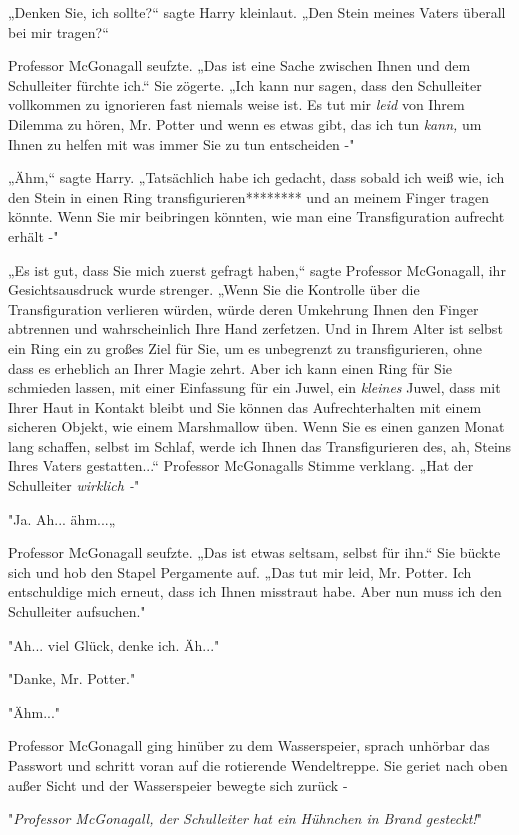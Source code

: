 {„Denken Sie, ich sollte?“ sagte Harry kleinlaut. „Den Stein meines Vaters überall bei mir tragen?“

Professor McGonagall seufzte. „Das ist eine Sache zwischen Ihnen und dem Schulleiter fürchte ich.“ Sie zögerte. „Ich kann nur sagen, dass den Schulleiter vollkommen zu ignorieren fast niemals weise ist. Es tut mir \emph{leid} von Ihrem Dilemma zu hören, Mr. Potter und wenn es etwas gibt, das ich tun \emph{kann,} um Ihnen zu helfen mit was immer Sie zu tun entscheiden -"

„Ähm,“ sagte Harry. „Tatsächlich habe ich gedacht, dass sobald ich weiß wie, ich den Stein in einen Ring transfigurieren******** und an meinem Finger tragen könnte. Wenn Sie mir beibringen könnten, wie man eine Transfiguration aufrecht erhält -"

„Es ist gut, dass Sie mich zuerst gefragt haben,“ sagte Professor McGonagall, ihr Gesichtsausdruck wurde strenger. „Wenn Sie die Kontrolle über die Transfiguration verlieren würden, würde deren Umkehrung Ihnen den Finger abtrennen und wahrscheinlich Ihre Hand zerfetzen. Und in Ihrem Alter ist selbst ein Ring ein zu großes Ziel für Sie, um es unbegrenzt zu transfigurieren, ohne dass es erheblich an Ihrer Magie zehrt. Aber ich kann einen Ring für Sie schmieden lassen, mit einer Einfassung für ein Juwel, ein \emph{kleines} Juwel, dass mit Ihrer Haut in Kontakt bleibt und Sie können das Aufrechterhalten mit einem sicheren Objekt, wie einem Marshmallow üben. Wenn Sie es einen ganzen Monat lang schaffen, selbst im Schlaf, werde ich Ihnen das Transfigurieren des, ah, Steins Ihres Vaters gestatten...“ Professor McGonagalls Stimme verklang. „Hat der Schulleiter \emph{wirklich -}"

"Ja. Ah... ähm...„

Professor McGonagall seufzte. „Das ist etwas seltsam, selbst für ihn.“ Sie bückte sich und hob den Stapel Pergamente auf. „Das tut mir leid, Mr. Potter. Ich entschuldige mich erneut, dass ich Ihnen misstraut habe. Aber nun muss ich den Schulleiter aufsuchen."

"Ah... viel Glück, denke ich. Äh..."

"Danke, Mr. Potter."

"Ähm..."

Professor McGonagall ging hinüber zu dem Wasserspeier, sprach unhörbar das Passwort und schritt voran auf die rotierende Wendeltreppe. Sie geriet nach oben außer Sicht und der Wasserspeier bewegte sich zurück -

"\emph{Professor McGonagall, der Schulleiter hat ein Hühnchen in Brand gesteckt!}"

}
